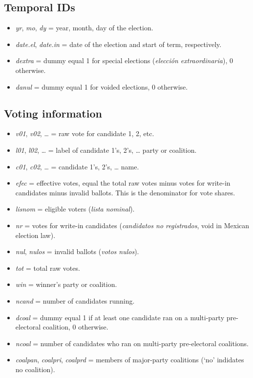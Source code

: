 \documentclass[11pt]{article}
\begin{document}
\subsection{Temporal IDs}
\label{sec:org77eb875}
\begin{itemize}
\item \emph{yr}, \emph{mo}, \emph{dy} = year, month, day of the election.
\item \emph{date.el}, \emph{date.in} = date of the election and start of term, respectively.
\item \emph{dextra} = dummy equal 1 for special elections (\emph{elección extraordinaria}), 0 otherwise.
\item \emph{danul} = dummy equal 1 for voided elections, 0 otherwise.
\end{itemize}
\subsection{Voting information}
\label{sec:orgfe872bc}
\begin{itemize}
\item \emph{v01}, \emph{v02}, \ldots{} = raw vote for candidate 1, 2, etc.
\item \emph{l01}, \emph{l02}, \ldots{} = label of candidate 1's, 2's, \ldots{} party or coalition.
\item \emph{c01}, \emph{c02}, \ldots{} = candidate 1's, 2's, \ldots{} name.
\item \emph{efec} = effective votes, equal the total raw votes minus votes for write-in candidates minus invalid ballots. This is the denominator for vote shares.
\item \emph{lisnom} = eligible voters (\emph{lista nominal}).
\item \emph{nr} = votes for write-in candidates (\emph{candidatos no registrados}, void in Mexican election law).
\item \emph{nul}, \emph{nulos} = invalid ballots (\emph{votos nulos}).
\item \emph{tot} = total raw votes.
\item \emph{win} = winner's party or coalition.
\item \emph{ncand} = number of candidates running.
\item \emph{dcoal} = dummy equal 1 if at least one candidate ran on a multi-party pre-electoral coalition, 0 otherwise.
\item \emph{ncoal} = number of candidates who ran on multi-party pre-electoral coalitions.
\item \emph{coalpan}, \emph{coalpri}, \emph{coalprd} = members of major-party coalitions (`no' indidates no coalition).
\end{itemize}
\end{document}
